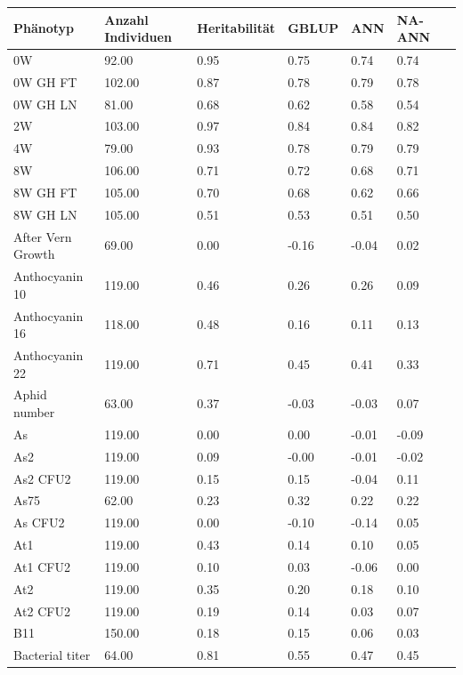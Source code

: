 \documentclass[ngerman,onecolumn,bibliography=totocnumbered]{scrreprt}
\begin{document}
\begin{table}[]
\begin{tabular}{|l|l|l|l|l|l|l|}
\hline
Phänotyp 					& Anzahl Individuen & Heritabilität & GBLUP & ANN 	 & NA-ANN \\ \hline
0W  & 92.00  & 0.95  & 0.75  & 0.74  & 0.74 \\ \hline
0W GH FT  & 102.00  & 0.87  & 0.78  & 0.79  & 0.78 \\ \hline
0W GH LN  & 81.00  & 0.68  & 0.62  & 0.58  & 0.54 \\ \hline
2W  & 103.00  & 0.97  & 0.84  & 0.84  & 0.82 \\ \hline
4W  & 79.00  & 0.93  & 0.78  & 0.79  & 0.79 \\ \hline
8W  & 106.00  & 0.71  & 0.72  & 0.68  & 0.71 \\ \hline
8W GH FT  & 105.00  & 0.70  & 0.68  & 0.62  & 0.66 \\ \hline
8W GH LN  & 105.00  & 0.51  & 0.53  & 0.51  & 0.50 \\ \hline
After Vern Growth  & 69.00  & 0.00  & -0.16  & -0.04  & 0.02 \\ \hline
Anthocyanin 10  & 119.00  & 0.46  & 0.26  & 0.26  & 0.09 \\ \hline
Anthocyanin 16  & 118.00  & 0.48  & 0.16  & 0.11  & 0.13 \\ \hline
Anthocyanin 22  & 119.00  & 0.71  & 0.45  & 0.41  & 0.33 \\ \hline
Aphid number  & 63.00  & 0.37  & -0.03  & -0.03  & 0.07 \\ \hline
As  & 119.00  & 0.00  & 0.00  & -0.01  & -0.09 \\ \hline
As2  & 119.00  & 0.09  & -0.00  & -0.01  & -0.02 \\ \hline
As2 CFU2  & 119.00  & 0.15  & 0.15  & -0.04  & 0.11 \\ \hline
As75  & 62.00  & 0.23  & 0.32  & 0.22  & 0.22 \\ \hline
As CFU2  & 119.00  & 0.00  & -0.10  & -0.14  & 0.05 \\ \hline
At1  & 119.00  & 0.43  & 0.14  & 0.10  & 0.05 \\ \hline
At1 CFU2  & 119.00  & 0.10  & 0.03  & -0.06  & 0.00 \\ \hline
At2  & 119.00  & 0.35  & 0.20  & 0.18  & 0.10 \\ \hline
At2 CFU2  & 119.00  & 0.19  & 0.14  & 0.03  & 0.07 \\ \hline
B11  & 150.00  & 0.18  & 0.15  & 0.06  & 0.03 \\ \hline
Bacterial titer  & 64.00  & 0.81  & 0.55  & 0.47  & 0.45 \\ \hline

\end{tabular}
\end{table}
\end{document}

